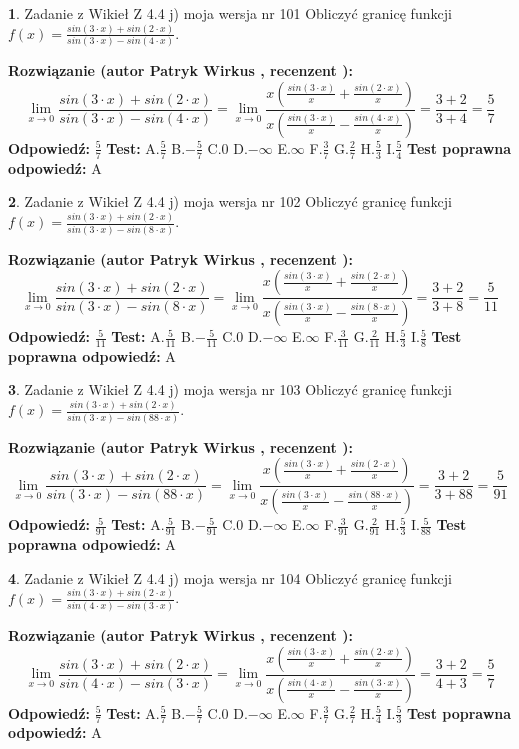 \documentclass[12pt, a4paper]{article}
\theoremstyle{definition} %
\newtheorem{zad}{}
\newcommand{\zadStart}[1]{\begin{zad}#1\newline}
\newcommand{\zadStop}{\end{zad}}
\newcommand{\rozwStart}[2]{\noindent \textbf{Rozwiązanie (autor #1 , recenzent #2): }\newline}
\newcommand{\rozwStop}{\newline}
\newcommand{\odpStart}{\noindent \textbf{Odpowiedź:}\newline}
\newcommand{\odpStop}{\newline}
\newcommand{\testStart}{\noindent \textbf{Test:}\newline}
\newcommand{\testStop}{\newline}
\newcommand{\kluczStart}{\noindent \textbf{Test poprawna odpowiedź:}\newline}
\newcommand{\kluczStop}{\newline}
\begin{document}
\zadStart{Zadanie z Wikieł Z 4.4 j) moja wersja nr 101}
Obliczyć granicę funkcji $f(x)=\frac{sin(3\cdot x) +sin(2\cdot x)}{sin(3\cdot x) -sin(4\cdot x)}$.
\zadStop
\rozwStart{Patryk Wirkus}{}
$$\lim\limits_{x\to 0}\frac{sin(3\cdot x) +sin(2\cdot x)}{sin(3\cdot x) -sin(4\cdot x)}=\lim\limits_{x\to 0}\frac{x(\frac{sin(3\cdot x)}{x}+\frac{sin(2\cdot x)}{x})}{x(\frac{sin(3\cdot x)}{x}-\frac{sin(4\cdot x)}{x})}=\frac{3+2}{3+4} = \frac{5}{7}$$
\rozwStop
\odpStart
$\frac{5}{7}$
\odpStop
\testStart
A.$\frac{5}{7}$
B.$-\frac{5}{7}$
C.$0$
D.$-\infty$
E.$\infty$
F.$\frac{3}{7}$
G.$\frac{2}{7}$
H.$\frac{5}{3}$
I.$\frac{5}{4}$
\testStop
\kluczStart
A
\kluczStop



\zadStart{Zadanie z Wikieł Z 4.4 j) moja wersja nr 102}
Obliczyć granicę funkcji $f(x)=\frac{sin(3\cdot x) +sin(2\cdot x)}{sin(3\cdot x) -sin(8\cdot x)}$.
\zadStop
\rozwStart{Patryk Wirkus}{}
$$\lim\limits_{x\to 0}\frac{sin(3\cdot x) +sin(2\cdot x)}{sin(3\cdot x) -sin(8\cdot x)}=\lim\limits_{x\to 0}\frac{x(\frac{sin(3\cdot x)}{x}+\frac{sin(2\cdot x)}{x})}{x(\frac{sin(3\cdot x)}{x}-\frac{sin(8\cdot x)}{x})}=\frac{3+2}{3+8} = \frac{5}{11}$$
\rozwStop
\odpStart
$\frac{5}{11}$
\odpStop
\testStart
A.$\frac{5}{11}$
B.$-\frac{5}{11}$
C.$0$
D.$-\infty$
E.$\infty$
F.$\frac{3}{11}$
G.$\frac{2}{11}$
H.$\frac{5}{3}$
I.$\frac{5}{8}$
\testStop
\kluczStart
A
\kluczStop



\zadStart{Zadanie z Wikieł Z 4.4 j) moja wersja nr 103}
Obliczyć granicę funkcji $f(x)=\frac{sin(3\cdot x) +sin(2\cdot x)}{sin(3\cdot x) -sin(88\cdot x)}$.
\zadStop
\rozwStart{Patryk Wirkus}{}
$$\lim\limits_{x\to 0}\frac{sin(3\cdot x) +sin(2\cdot x)}{sin(3\cdot x) -sin(88\cdot x)}=\lim\limits_{x\to 0}\frac{x(\frac{sin(3\cdot x)}{x}+\frac{sin(2\cdot x)}{x})}{x(\frac{sin(3\cdot x)}{x}-\frac{sin(88\cdot x)}{x})}=\frac{3+2}{3+88} = \frac{5}{91}$$
\rozwStop
\odpStart
$\frac{5}{91}$
\odpStop
\testStart
A.$\frac{5}{91}$
B.$-\frac{5}{91}$
C.$0$
D.$-\infty$
E.$\infty$
F.$\frac{3}{91}$
G.$\frac{2}{91}$
H.$\frac{5}{3}$
I.$\frac{5}{88}$
\testStop
\kluczStart
A
\kluczStop



\zadStart{Zadanie z Wikieł Z 4.4 j) moja wersja nr 104}
Obliczyć granicę funkcji $f(x)=\frac{sin(3\cdot x) +sin(2\cdot x)}{sin(4\cdot x) -sin(3\cdot x)}$.
\zadStop
\rozwStart{Patryk Wirkus}{}
$$\lim\limits_{x\to 0}\frac{sin(3\cdot x) +sin(2\cdot x)}{sin(4\cdot x) -sin(3\cdot x)}=\lim\limits_{x\to 0}\frac{x(\frac{sin(3\cdot x)}{x}+\frac{sin(2\cdot x)}{x})}{x(\frac{sin(4\cdot x)}{x}-\frac{sin(3\cdot x)}{x})}=\frac{3+2}{4+3} = \frac{5}{7}$$
\rozwStop
\odpStart
$\frac{5}{7}$
\odpStop
\testStart
A.$\frac{5}{7}$
B.$-\frac{5}{7}$
C.$0$
D.$-\infty$
E.$\infty$
F.$\frac{3}{7}$
G.$\frac{2}{7}$
H.$\frac{5}{4}$
I.$\frac{5}{3}$
\testStop
\kluczStart
A
\kluczStop
\end{document}
